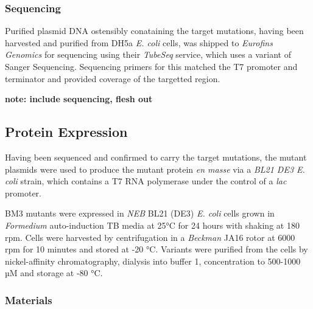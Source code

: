 \documentclass[16pt]{book}
\begin{document}
\subsubsection{Sequencing}

Purified plasmid DNA ostensibly conataining the target mutations, having been harvested and purified from DH5a \textit{E. coli} cells, was shipped to \textit{Eurofins Genomics} for sequencing using their \textit{TubeSeq} service, which uses a variant of Sanger Sequencing.
Sequencing primers for this matched the T7 promoter and terminator and provided coverage of the targetted region.

\textbf{note: include sequencing, flesh out}


\subsection{Protein Expression}

Having been sequenced and confirmed to carry the target mutations, the mutant plasmids were used to produce the mutant protein \textit{en masse} via a \textit{BL21 DE3 E. coli} strain, which contains a T7 RNA polymerase under the control of a \textit{lac} promoter.
\par
BM3 mutants were expressed in \textit{NEB} BL21 (DE3) \textit{E. coli} cells grown in \textit{Formedium} auto-induction TB media at 25°C for 24 hours with shaking at 180 rpm. Cells were harvested by centrifugation in a \textit{Beckman} JA16 rotor at 6000 rpm for 10 minutes and stored at -20 °C. Variants were purified from the cells by nickel-affinity chromatography, dialysis into buffer 1, concentration to 500-1000 µM and storage at -80 °C. %

\subsubsection{Materials}
\end{document}
